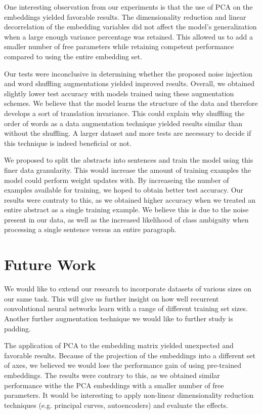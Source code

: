 One interesting observation from our experiments is that the use of PCA on the embeddings yielded favorable results. The dimensionality reduction and linear decorrelation of the embedding
variables did not affect the model's generalization when a large enough variance percentage was retained. This allowed us to add a smaller number of free parameters
while retaining competent performance compared to using the entire embedding set.

Our tests were inconclusive in determining whether the proposed noise injection and word shuffling augmentations yielded improved results. Overall, we obtained slightly
lower test accuracy with models trained using these augmentation schemes. We believe that the
model learns the structure of the data and therefore develops a sort of translation invariance. This could explain why shuffling the order of words as a data augmentation
technique yielded results similar than without the shuffling.
A larger dataset and more tests are necessary to decide if this technique is indeed beneficial or not.

We proposed to split the abstracts into sentences and train the model using this finer data granularity. This would increase the amount of training examples
the model could perform weight updates with. By increaseing the number of examples available for training, we hoped to obtain better test accuracy.
Our results were contraty to this, as we obtained higher accuracy when we treated an entire abstract as a single training example.
We believe this is due to the noise present in our data, as well as the increased likelihood of class ambiguity when processing a single sentence versus an entire
paragraph.

\section{Future Work}
We would like to extend our research to incorporate datasets of various sizes on our same task. This will give us further insight on how
well recurrent convolutional neural networks learn with a range of different training set sizes. Another further augmentation technique we would like to further
study is padding.

The application of PCA to the embedding matrix yielded unexpected and favorable results. Because of the projection of the embeddings into a different set of axes,
we believed we would lose the performance gain of using pre-trained embeddings. The results were contrary to this, as we obtained similar performance
withe the PCA embeddings with a smaller number of free parameters. It would be interesting to apply non-linear dimensionality
reduction techniques (e.g. principal curves, autoencoders) and evaluate the effects.

